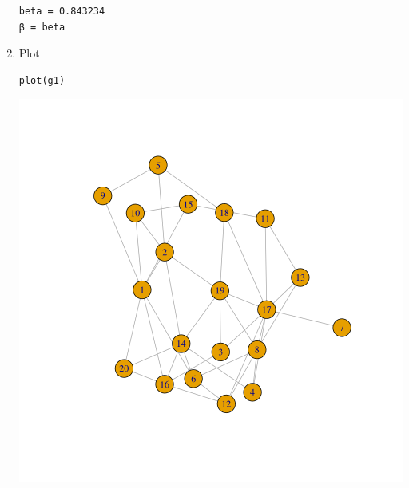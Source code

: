 \documentclass[11pt]{article}
\begin{document}
\begin{enumerate}
\begin{lstlisting}
beta = 0.843234
β = beta
\end{lstlisting}

\item Plot
\label{sec:org9507161}

\lstset{language=r,label= ,caption= ,captionpos=b,numbers=none}
\begin{lstlisting}
plot(g1)
\end{lstlisting}

\begin{center}
\includegraphics[width=.9\linewidth]{./Media/Example-graph-plot-debug-power-walk.png}
\end{center}
\end{enumerate}
\end{document}
